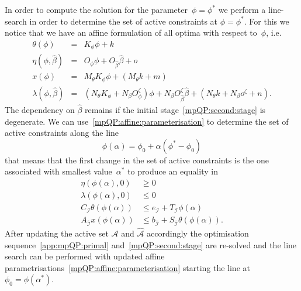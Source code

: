 In order to compute the solution for the parameter~$\phi = \phi^\ast$ we perform a line-search in order
to determine the set of active constraints at $\phi = \phi^\ast$.
%
For this we notice that we have an affine formulation of all optima with respect to~$\phi$, i.e.
%
\begin{equation}\label{mpQP:affine:parameterisation}
	\begin{array}{rcl} 
	\theta(\phi) &=&K_\phi \phi + k\\
	\eta(\phi,\hat \beta) &=& O_\phi \phi + O_{\hat\beta}\hat\beta + o\\
	x(\phi) &=& M_\theta K_\phi \phi + (M_\theta k+ m)\\
	\lambda(\phi, \hat\beta) &=& (N_\theta K_\phi + N_\beta O^\zeta_\phi)\phi + 
	N_\beta O^\zeta_{\hat\beta}\hat\beta + (N_\theta k + N_\beta o^\zeta + n) .
	\end{array}
\end{equation}
%
The dependency on $\hat\beta$ remains if the initial stage~\eqref{mpQP:second:stage} is degenerate.
%
We can use~\eqref{mpQP:affine:parameterisation} to determine the set of active constraints along the line
%
\begin{equation}
	\phi(\alpha) = \phi_0 + \alpha(\phi^\ast-\phi_0)
\end{equation}
%
that means that the first change in the set of active constraints is the one associated with smallest
value~$\alpha^\ast$ to produce an equality in
%
\begin{equation}\label{mpQP:conditions:for:the:line:search}
	\begin{split}
	\eta(\phi(\alpha),0)&\geq0\\
	\lambda(\phi(\alpha),0)&\leq0\\
	C_{\mathcal I}\theta(\phi(\alpha))&\leq e_{\mathcal I} + T_{\mathcal I}\phi(\alpha)\\
	A_{\hat{\mathcal I}}x(\phi(\alpha))&\leq b_{\hat{\mathcal I}}+S_{\hat{\mathcal I}}\theta(\phi(\alpha)).
	\end{split}
\end{equation}
%
After updating the active set $\mathcal A$ and $\hat{\mathcal A}$ accordingly the optimisation sequence~\eqref{app:mpQP:primal}
and~\eqref{mpQP:second:stage} are re-solved and the line search can be performed with updated affine 
parametrisations~\eqref{mpQP:affine:parameterisation} starting the line at~$\phi_0=\phi(\alpha^\ast)$.


